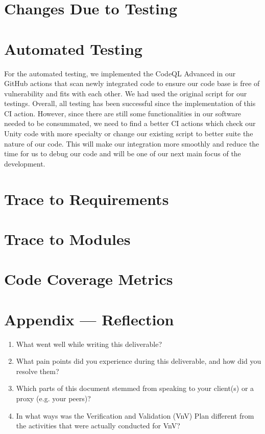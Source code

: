 \documentclass[12pt, titlepage]{article}
\begin{document}
\section{Changes Due to Testing}

\section{Automated Testing}
For the automated testing, we implemented the CodeQL Advanced in our GitHub actions that scan newly integrated code to ensure our code base is free of vulnerability and fits with each other. We had used the original script for our testings. Overall, all testing has been successful since the implementation of this CI action. However, since there are still some functionalities in our software needed to be consummated, we need to find a better CI actions which check our Unity code with more specialty or change our existing script to better suite the nature of our code. This will make our integration more smoothly and reduce the time for us to debug our code and will be one of our next main focus of the development.

\section{Trace to Requirements}

\section{Trace to Modules}

\section{Code Coverage Metrics}




\newpage{}
\section*{Appendix --- Reflection}

\begin{enumerate}
  \item What went well while writing this deliverable?
  \item What pain points did you experience during this deliverable, and how did you resolve them?
  \item Which parts of this document stemmed from speaking to your client(s) or a proxy (e.g. your peers)?
  \item In what ways was the Verification and Validation (VnV) Plan different from the activities that were actually conducted for VnV?
\end{enumerate}
\end{document}
